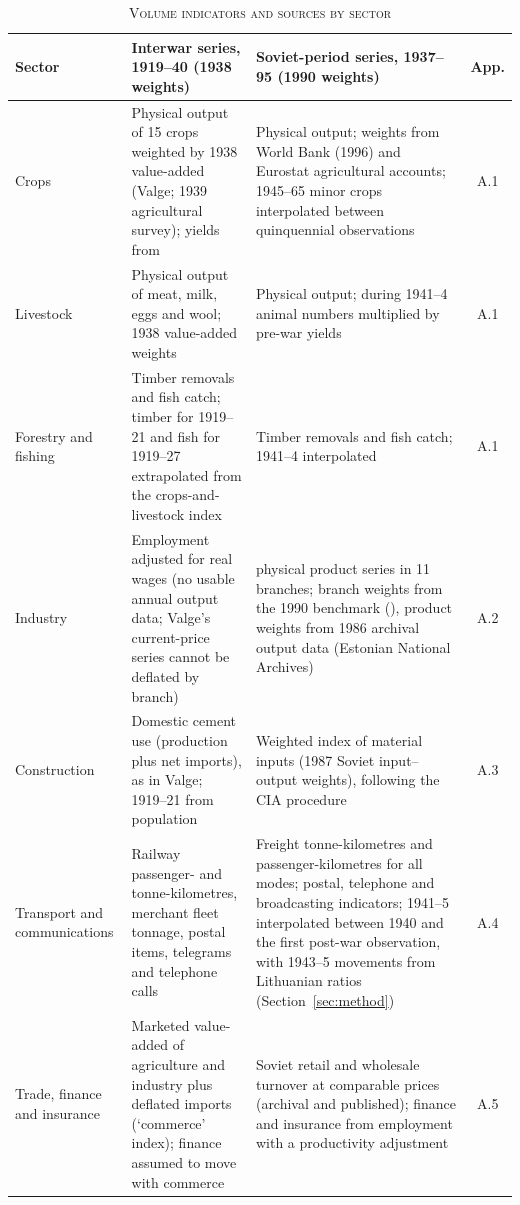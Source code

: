 \begin{table}[htbp]
\centering\footnotesize
\caption[Volume indicators and sources by sector]{\textsc{Volume indicators and sources by sector}}
\label{tab:sources}
\begin{threeparttable}
\begin{tabular}{>{\RaggedRight}p{2.6cm}>{\RaggedRight}p{5.3cm}>{\RaggedRight}p{5.3cm}c}
\toprule
Sector & Interwar series, 1919--40 (1938 weights) & Soviet-period series, 1937--95 (1990 weights) & App. \\
\midrule
Crops & Physical output of 15 crops weighted by 1938 value-added (Valge; 1939 agricultural survey); yields from \cite{klesment2007} & Physical output; weights from World Bank (1996) and Eurostat agricultural accounts; 1945--65 minor crops interpolated between quinquennial observations & A.1 \\
Livestock & Physical output of meat, milk, eggs and wool; 1938 value-added weights & Physical output; during 1941--4 animal numbers multiplied by pre-war yields & A.1 \\
Forestry and fishing & Timber removals and fish catch; timber for 1919--21 and fish for 1919--27 extrapolated from the crops-and-livestock index & Timber removals and fish catch; 1941--4 interpolated & A.1 \\
Industry & Employment adjusted for real wages (no usable annual output data; Valge's current-price series cannot be deflated by branch) & 101 physical product series in 11 branches; branch weights from the 1990 benchmark (\cite[190, table 5]{bolotin1992}), product weights from 1986 archival output data (Estonian National Archives) & A.2 \\
Construction & Domestic cement use (production plus net imports), as in Valge; 1919--21 from population & Weighted index of material inputs (1987 Soviet input--output weights), following the CIA procedure & A.3 \\
Transport and communications & Railway passenger- and tonne-kilometres, merchant fleet tonnage, postal items, telegrams and telephone calls & Freight tonne-kilometres and passenger-kilometres for all modes; postal, telephone and broadcasting indicators; 1941--5 interpolated between 1940 and the first post-war observation, with 1943--5 movements from Lithuanian ratios (Section~\ref{sec:method}) & A.4 \\
Trade, finance and insurance & Marketed value-added of agriculture and industry plus deflated imports (`commerce' index); finance assumed to move with commerce & Soviet retail and wholesale turnover at comparable prices (archival and published); finance and insurance from employment with a productivity adjustment & A.5 \\

\end{tabular}
\end{threeparttable}
\end{table}
